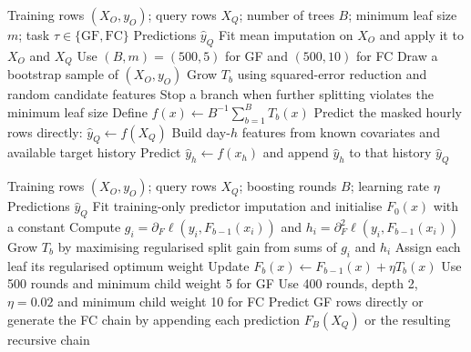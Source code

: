 \begin{algorithm}[H]
\caption{Random Forest reconstruction or recursive forecasting}
\label{alg:app-rf}
\small
\begin{algorithmic}[1]
\Require Training rows $(X_O,y_O)$; query rows $X_Q$; number of trees $B$;
minimum leaf size $m$; task $\tau\in\{\mathrm{GF},\mathrm{FC}\}$
\Ensure Predictions $\hat y_Q$
\State Fit mean imputation on $X_O$ and apply it to $X_O$ and $X_Q$
\State Use $(B,m)=(500,5)$ for GF and $(500,10)$ for FC
    \State Draw a bootstrap sample of $(X_O,y_O)$
    \State Grow $T_b$ using squared-error reduction and random candidate features
    \State Stop a branch when further splitting violates the minimum leaf size
\EndFor
\State Define $f(x)\gets B^{-1}\sum_{b=1}^{B}T_b(x)$
    \State Predict the masked hourly rows directly: $\hat y_Q\gets f(X_Q)$
\Else
        \State Build day-$h$ features from known covariates and available target history
        \State Predict $\hat y_h\gets f(x_h)$ and append $\hat y_h$ to that history
    \EndFor
\EndIf
\State \Return $\hat y_Q$
\end{algorithmic}
\end{algorithm}

\begin{algorithm}[H]
\caption{XGBoost reconstruction or recursive forecasting}
\label{alg:app-xgboost}
\small
\begin{algorithmic}[1]
\Require Training rows $(X_O,y_O)$; query rows $X_Q$; boosting rounds $B$;
learning rate $\eta$
\Ensure Predictions $\hat y_Q$
\State Fit training-only predictor imputation and initialise $F_0(x)$ with a constant
        \State Compute $g_i=\partial_F\ell(y_i,F_{b-1}(x_i))$ and
        $h_i=\partial_F^2\ell(y_i,F_{b-1}(x_i))$
    \EndFor
    \State Grow $T_b$ by maximising regularised split gain from sums of $g_i$ and $h_i$
    \State Assign each leaf its regularised optimum weight
    \State Update $F_b(x)\gets F_{b-1}(x)+\eta T_b(x)$
\EndFor
\State Use 500 rounds and minimum child weight 5 for GF
\State Use 400 rounds, depth 2, $\eta=0.02$ and minimum child weight 10 for FC
\State Predict GF rows directly or generate the FC chain by appending each prediction
\State \Return $F_B(X_Q)$ or the resulting recursive chain
\end{algorithmic}
\end{algorithm}

